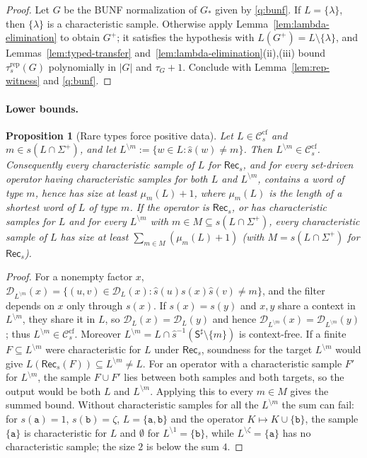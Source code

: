\documentclass[11pt]{article}
\numberwithin{equation}{section}
\theoremstyle{plain}
\newtheorem{proposition}[theorem]{Proposition}
\theoremstyle{definition}
\theoremstyle{remark}
\theoremstyle{plain}
\newcommand{\cf}{\mathrm{cf}}
\newcommand{\Ccf}[1]{\mathcal C_{#1}^{\cf}}
\newcommand{\Rec}{\mathsf{Rec}}
\newcommand{\D}{\mathcal{D}}
\begin{document}
\begin{proof}
Let $G$ be the BUNF normalization of $G_*$ given by \ref{q:bunf}.  If
$L=\{\lambda\}$, then $\{\lambda\}$ is a characteristic sample.  Otherwise apply
Lemma~\ref{lem:lambda-elimination} to obtain $G^+$; it satisfies the
hypothesis with $L(G^+)=L\setminus\{\lambda\}$, and
Lemmas~\ref{lem:typed-transfer} and~\ref{lem:lambda-elimination}(ii),(iii) bound
$\tau^{\mathrm{rep}}_s(G)$ polynomially in $|G|$ and $\tau_G+1$.  Conclude
with Lemma~\ref{lem:rep-witness} and \ref{q:bunf}.
\end{proof}

\paragraph{Lower bounds.}
\begin{proposition}[Rare types force positive data]
\label{prop:rare-type}
Let $L\in\Ccf{s}$ and $m\in s(L\cap\Sigma^+)$, and let
$L^{\setminus m}:=\{w\in L:\widehat s(w)\ne m\}$.  Then
$L^{\setminus m}\in\Ccf{s}$.  Consequently every characteristic sample of $L$ for $\Rec_s$, and for every
set-driven operator having characteristic samples for both $L$ and
$L^{\setminus m}$, contains a word of type $m$, hence has size at least
$\mu_m(L)+1$, where $\mu_m(L)$ is the length of a shortest word of $L$ of type
$m$.  If the operator is $\Rec_s$, or has characteristic samples for $L$ and
for every $L^{\setminus m}$ with $m\in M\subseteq s(L\cap\Sigma^+)$, every
characteristic sample of $L$ has size at least $\sum_{m\in M}(\mu_m(L)+1)$
\textup(with $M=s(L\cap\Sigma^+)$ for $\Rec_s$\textup).
\end{proposition}

\begin{proof}
For a nonempty factor $x$, $\D_{L^{\setminus m}}(x)=\{(u,v)\in\D_L(x):
\widehat s(u)s(x)\widehat s(v)\ne m\}$, and the filter depends on $x$ only
through $s(x)$.  If $s(x)=s(y)$ and $x,y$ share a context in $L^{\setminus m}$,
they share it in $L$, so $\D_L(x)=\D_L(y)$ and hence
$\D_{L^{\setminus m}}(x)=\D_{L^{\setminus m}}(y)$; thus $L^{\setminus m}\in\Ccf{s}$.
Moreover $L^{\setminus m}=L\cap\widehat s^{-1}(\mathsf S^\sharp\setminus\{m\})$ is
context-free.  If a finite $F\subseteq L^{\setminus m}$ were characteristic for $L$
under $\Rec_s$, soundness \cite[Theorem~4.2]{kuriyamaCFG} for the target
$L^{\setminus m}$ would give $L(\Rec_s(F))\subseteq L^{\setminus m}\ne L$.  For an
operator with a characteristic sample $F'$ for $L^{\setminus m}$, the sample
$F\cup F'$ lies between both samples and both targets, so the output would be
both $L$ and $L^{\setminus m}$.  Applying this to every $m\in M$ gives the summed
bound.  Without characteristic samples for all the $L^{\setminus m}$ the sum can
fail: for $s(\mathtt a)=1$, $s(\mathtt b)=\zeta$, $L=\{\mathtt a,\mathtt b\}$ and the
operator $K\mapsto K\cup\{\mathtt b\}$, the sample $\{\mathtt a\}$ is
characteristic for $L$ and $\emptyset$ for $L^{\setminus1}=\{\mathtt b\}$, while
$L^{\setminus\zeta}=\{\mathtt a\}$ has no characteristic sample; the size $2$ is
below the sum $4$.
\end{proof}
\end{document}
